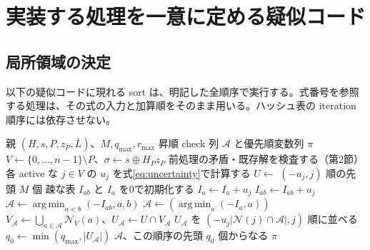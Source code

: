 \documentclass[a4paper,11pt]{ltjsarticle}
\numberwithin{equation}{section}
\theoremstyle{definition}
\newcommand{\N}{\mathcal N}
\newcommand{\A}{\mathcal A}
\DeclareMathOperator*{\argmin}{arg\,min}
\begin{document}
\section{実装する処理を一意に定める疑似コード}
\subsection{局所領域の決定}
以下の疑似コードに現れる sort は、明記した全順序で実行する。式番号を参照する処理は、その式の入力と加算順をそのまま用いる。ハッシュ表の iteration 順序には依存させない。

\begin{algorithm}[H]
\caption{親状態から選択 check と固定優先順を作る}
\begin{algorithmic}[1]
\Require 親 $(H,s,P,z_P,\bar L)$、$M,q_{\max},r_{\max}$
\Ensure 昇順 check 列 $\A$ と優先順変数列 $\pi$
\State $V\gets\{0,\ldots,n-1\}\setminus P$、$\sigma\gets s\oplus H_Pz_P$
\State 前処理の矛盾・既存解を検査する（第2節）
\State 各 active な $j\in V$ の $u_j$ を式\eqref{eq:uncertainty}で計算する
\State $U\gets$ $(-u_j,j)$ 順の先頭 $M$ 個
\State 疎な表 $I_{ab}$ と $I_a$ を0で初期化する
  \For{$a\in\N(j)$}
    \State $I_a\gets I_a+u_j$
  \EndFor
  \For{$a<b$、$a,b\in\N(j)$}
    \State $I_{ab}\gets I_{ab}+u_j$
  \EndFor
\EndFor
{}
  \State $\A\gets\argmin_{a<b}(-I_{ab},a,b)$
\Else
  \State $\A\gets(\argmin_a(-I_a,a))$
\EndIf
\State $V_\A\gets\bigcup_{a\in\A}\N_V(a)$、$U_\A\gets U\cap V_\A$
\State $U_\A$ を $(-u_j|\N(j)\cap\A|,j)$ 順に並べる
\State $q_0\gets\min(q_{\max},|U_\A|)$
\State \Return $\A$、この順序の先頭 $q_0$ 個からなる $\pi$
\end{algorithmic}
\end{algorithm}
\end{document}
